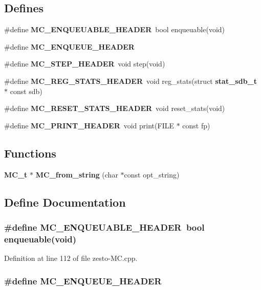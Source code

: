 \subsection*{Defines}
\begin{CompactItemize}
\item 
\#define {\bf MC\_\-ENQUEUABLE\_\-HEADER}~bool enqueuable(void)
\item 
\#define {\bf MC\_\-ENQUEUE\_\-HEADER}
\item 
\#define {\bf MC\_\-STEP\_\-HEADER}~void step(void)
\item 
\#define {\bf MC\_\-REG\_\-STATS\_\-HEADER}~void reg\_\-stats(struct {\bf stat\_\-sdb\_\-t} $\ast$ const sdb)
\item 
\#define {\bf MC\_\-RESET\_\-STATS\_\-HEADER}~void reset\_\-stats(void)
\item 
\#define {\bf MC\_\-PRINT\_\-HEADER}~void print(FILE $\ast$ const fp)
\end{CompactItemize}
\subsection*{Functions}
\begin{CompactItemize}
\item 
{\bf MC\_\-t} $\ast$ {\bf MC\_\-from\_\-string} (char $\ast$const opt\_\-string)
\end{CompactItemize}


\subsection{Define Documentation}
\subsubsection[{MC\_\-ENQUEUABLE\_\-HEADER}]{\setlength{\rightskip}{0pt plus 5cm}\#define MC\_\-ENQUEUABLE\_\-HEADER~bool enqueuable(void)}\label{zesto-MC_8cpp_e93aad45561679f1ce25e3a331c1e1d8}




Definition at line 112 of file zesto-MC.cpp.
\subsubsection[{MC\_\-ENQUEUE\_\-HEADER}]{\setlength{\rightskip}{0pt plus 5cm}\#define MC\_\-ENQUEUE\_\-HEADER}\label{zesto-MC_8cpp_ded7ebbc2a194b6094d603322969e07a}


